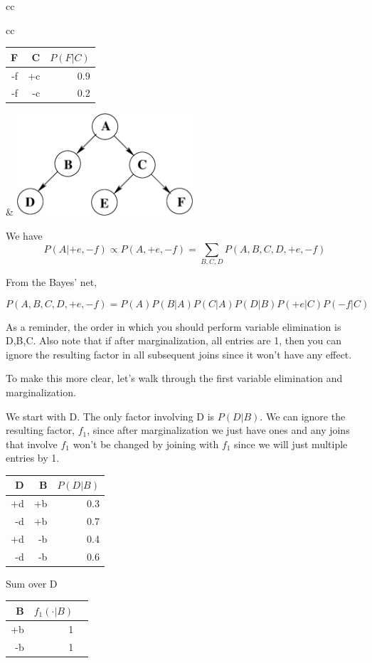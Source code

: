\documentclass[12pt]{article}
\begin{document}
\begin{tabular}{cc}
\begin{tabular}{cc}
\begin{tabular}{|r|r|r|}
F  & C  & $P(F|C)$ \\ \hline
-f & +c & 0.9      \\ \hline
-f & -c & 0.2      \\ \hline
\end{tabular}
\end{tabular} & 
\includegraphics[height=1.5in]{ABCDEF.eps}
\end{tabular}

\vspace{0.5cm}
We have 
$$P(A|+e,-f) \propto P(A,+e,-f) = \sum_{B,C,D} P(A,B,C,D,+e,-f)$$

From the Bayes' net,

$$P(A,B,C,D,+e,-f) = P(A) P(B|A) P(C|A) P(D|B) P(+e|C) P(-f|C)$$

As a reminder, the order in which you should perform variable elimination is D,B,C. Also note that if after marginalization, all entries are 1, then you can ignore the resulting factor in all subsequent joins since it won't have any effect.

To make this more clear, let's walk through the first variable elimination and marginalization.

We start with D. The only factor involving D is $P(D|B)$. We can ignore the resulting factor, $f_1$, since after marginalization we just have ones and any joins that involve $f_1$ won't be changed by joining with $f_1$ since we will just multiple entries by 1.

\begin{tabular}{|r|r|r|} \hline
D  & B  & $P(D|B)$ \\ \hline
+d & +b & 0.3      \\ \hline
-d & +b & 0.7      \\ \hline
+d & -b & 0.4      \\ \hline
-d & -b & 0.6      \\ \hline
\end{tabular} Sum over D
\begin{tabular}{|r|r|r|} \hline
 B  & $f_1(\cdot|B)$ \\ \hline
+b & 1      \\ \hline
 -b & 1      \\ \hline
\end{tabular}\\
\end{document}
